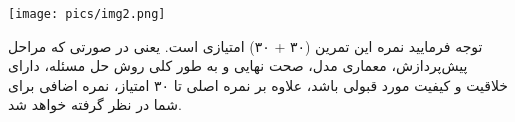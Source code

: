 \begin{center}
	\texttt{[image: pics/img2.png]}
	\label{تصاویر پوشه selected_images}
\end{center}


توجه فرمایید نمره این تمرین (۳۰ + ۳۰) امتیازی است. یعنی در صورتی که مراحل پیش‌پردازش، معماری مدل، صحت نهایی و به طور کلی روش حل مسئله، دارای خلاقیت و کیفیت مورد قبولی باشد، علاوه بر نمره اصلی تا ۳۰ امتیاز، نمره اضافی برای شما در نظر گرفته خواهد شد.

\begin{qsolve}

\end{qsolve}